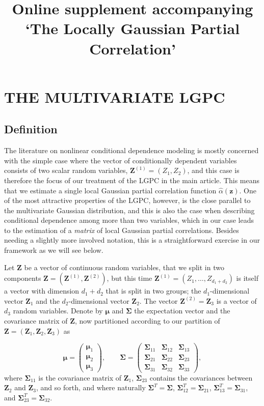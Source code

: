 \documentclass[
  12pt,
  letterpaper]{article}
\title{Online supplement accompanying `The Locally Gaussian Partial Correlation'}
\author{}
\date{\vspace{-2.5em}}
\numberwithin{equation}{section}
\newcommand{\Z}{\bm{Z}}
\newcommand{\z}{\bm{z}}
\newcommand{\Zone}{\bm{Z}^{(1)}}
\newcommand{\Ztwo}{\bm{Z}^{(2)}}
\newcommand{\fmu}{\bm{\mu}}
\newcommand{\fSigma}{\bm{\Sigma}}
\begin{document}
\maketitle

\hypertarget{the-multivariate-lgpc}{%
\section{THE MULTIVARIATE LGPC}\label{the-multivariate-lgpc}}

\hypertarget{definition}{%
\subsection{Definition}\label{definition}}

The literature on nonlinear conditional dependence modeling is mostly concerned with the simple case where the vector of conditionally dependent variables consists of two scalar random variables, \(\Zone = (Z_1, Z_2)\), and this case is therefore the focus of our treatment of the LGPC in the main article. This means that we estimate a single local Gaussian partial correlation function \(\widehat \alpha(\z)\). One of the most attractive properties of the LGPC, however, is the close parallel to the multivariate Gaussian distribution, and this is also the case when describing conditional dependence among more than two variables, which in our case leads to the estimation of a \emph{matrix} of local Gaussian partial correlations. Besides needing a slightly more involved notation, this is a straightforward exercise in our framework as we will see below.

Let \(\Z\) be a vector of continuous random variables, that we split in two components \(\Z = (\Zone, \Ztwo)\), but this time \(\Zone = (Z_1, \ldots, Z_{d_1 + d_2})\) is itself a vector with dimension \(d_1 + d_2\) that is split in two groups; the \(d_1\)-dimensional vector \(\Z_1\) and the \(d_2\)-dimensional vector \(\Z_2\). The vector \(\Ztwo = \Z_3\) is a vector of \(d_3\) random variables. Denote by \(\fmu\) and \(\fSigma\) the expectation vector and the covariance matrix of \(\Z\), now partitioned according to our partition of \(\Z = (\Z_1, \Z_2, \Z_3)\) as

\[\fmu = \begin{pmatrix} \fmu_1 \\ \fmu_2 \\ \fmu_3 \end{pmatrix}, \qquad \fSigma = \begin{pmatrix} \fSigma_{11} & \fSigma_{12} & \fSigma_{13} \\ \fSigma_{21} & \fSigma_{22} & \fSigma_{23} \\ \fSigma_{31} & \fSigma_{32} & \fSigma_{33} \end{pmatrix},\]
where \(\fSigma_{11}\) is the covariance matrix of \(\Z_1\), \(\fSigma_{23}\) contains the covariances between \(\Z_2\) and \(\Z_3\), and so forth, and where naturally \(\fSigma^T = \fSigma\), \(\fSigma_{12}^T = \fSigma_{21}\), \(\fSigma_{13}^T = \fSigma_{31}\), and \(\fSigma_{23}^T = \fSigma_{32}\).
\end{document}
